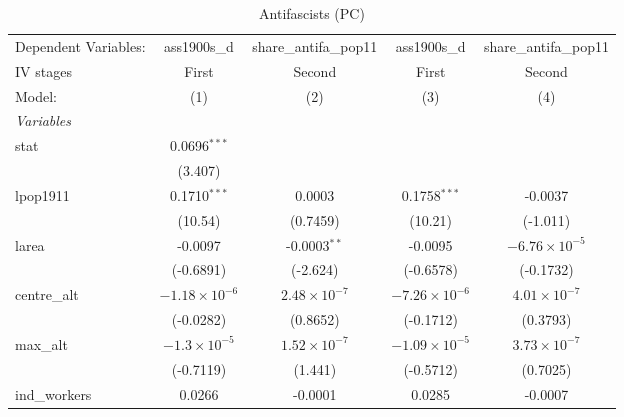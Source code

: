 
\begin{table}[htbp]
   \caption{Antifascists (PC)}
   \centering
   \begin{tabular}{lcccc}
      \tabularnewline \midrule \midrule
      Dependent Variables:             & ass1900s\_d            & share\_antifa\_pop11   & ass1900s\_d            & share\_antifa\_pop11\\    
      IV stages                        & First                  & Second                 & First                  & Second \\   
      Model:                           & (1)                    & (2)                    & (3)                    & (4)\\  
      \midrule
      \emph{Variables}\\
      stat                             & 0.0696$^{***}$         &                        &                        &   \\   
                                       & (3.407)                &                        &                        &   \\   
      lpop1911                         & 0.1710$^{***}$         & 0.0003                 & 0.1758$^{***}$         & -0.0037\\   
                                       & (10.54)                & (0.7459)               & (10.21)                & (-1.011)\\   
      larea                            & -0.0097                & -0.0003$^{**}$         & -0.0095                & $-6.76\times 10^{-5}$\\    
                                       & (-0.6891)              & (-2.624)               & (-0.6578)              & (-0.1732)\\   
      centre\_alt                      & $-1.18\times 10^{-6}$  & $2.48\times 10^{-7}$   & $-7.26\times 10^{-6}$  & $4.01\times 10^{-7}$\\    
                                       & (-0.0282)              & (0.8652)               & (-0.1712)              & (0.3793)\\   
      max\_alt                         & $-1.3\times 10^{-5}$   & $1.52\times 10^{-7}$   & $-1.09\times 10^{-5}$  & $3.73\times 10^{-7}$\\    
                                       & (-0.7119)              & (1.441)                & (-0.5712)              & (0.7025)\\   
      ind\_workers                     & 0.0266                 & -0.0001                & 0.0285                 & -0.0007\\   

\end{tabular}
\end{table}
